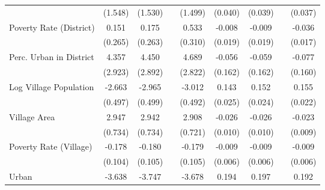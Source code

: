 {\begin{tabular}{l*{8}{c}}
                    &     (1.548)        &     (1.530)        &                    &     (1.499)        &     (0.040)        &     (0.039)        &                    &     (0.037)        \\
Poverty Rate (District)&       0.151        &       0.175        &                    &       0.533        &      -0.008        &      -0.009        &                    &      -0.036\sym{*} \\
                    &     (0.265)        &     (0.263)        &                    &     (0.310)        &     (0.019)        &     (0.019)        &                    &     (0.017)        \\
Perc. Urban in District&       4.357        &       4.450        &                    &       4.689        &      -0.056        &      -0.059        &                    &      -0.077        \\
                    &     (2.923)        &     (2.892)        &                    &     (2.822)        &     (0.162)        &     (0.162)        &                    &     (0.160)        \\
Log Village Population&      -2.663\sym{**}&      -2.965\sym{**}&                    &      -3.012\sym{**}&       0.143\sym{**}&       0.152\sym{**}&                    &       0.155\sym{**}\\
                    &     (0.497)        &     (0.499)        &                    &     (0.492)        &     (0.025)        &     (0.024)        &                    &     (0.022)        \\
Village Area        &       2.947\sym{**}&       2.942\sym{**}&                    &       2.908\sym{**}&      -0.026\sym{*} &      -0.026\sym{*} &                    &      -0.023\sym{*} \\
                    &     (0.734)        &     (0.734)        &                    &     (0.721)        &     (0.010)        &     (0.010)        &                    &     (0.009)        \\
Poverty Rate (Village)&      -0.178        &      -0.180        &                    &      -0.179        &      -0.009        &      -0.009        &                    &      -0.009        \\
                    &     (0.104)        &     (0.105)        &                    &     (0.105)        &     (0.006)        &     (0.006)        &                    &     (0.006)        \\
Urban               &      -3.638\sym{**}&      -3.747\sym{**}&                    &      -3.678\sym{**}&       0.194\sym{**}&       0.197\sym{**}&                    &       0.192\sym{**}\\

\end{tabular}}
